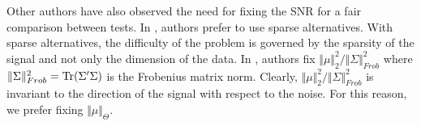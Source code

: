 \documentclass[]{bio}
\begin{document}
Other authors have also observed the need for fixing the SNR for a fair comparison between tests.
In \cite{ramdas2015decreasing}, authors prefer to use sparse alternatives.
With sparse alternatives, the difficulty of the problem is governed by the sparsity of the signal and not only the dimension of the data. 
In \cite{chen2010two}, authors fix $\Vert \mu \Vert_2^2/\Vert \Sigma \Vert^2_{Frob}$ where $\Vert \Sigma \Vert^2_{Frob}=\operatorname{Tr}(\Sigma'\Sigma)$ is the Frobenius matrix norm. 
Clearly, $\Vert \mu \Vert_2^2/\Vert \Sigma \Vert^2_{Frob}$ is invariant to the direction of the signal with respect to the noise. 
For this reason, we prefer fixing $\Vert \mu \Vert_\Theta$.



\newpage


\end{document}
